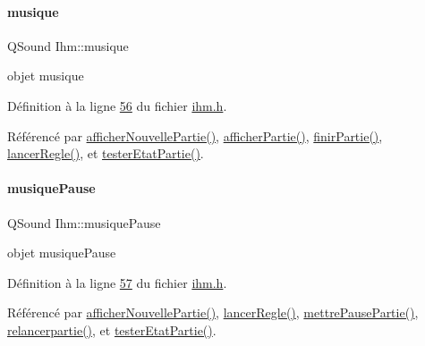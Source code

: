 \mbox{\label{class_ihm_a6e2a173ec36ee846d6210117b4b85fa8}} 
\paragraph{\texorpdfstring{musique}{musique}}
{\footnotesize\ttfamily Q\+Sound Ihm\+::musique\hspace{0.3cm}{\ttfamily [private]}}



objet musique 



Définition à la ligne \hyperlink{ihm_8h_source_l00056}{56} du fichier \hyperlink{ihm_8h_source}{ihm.\+h}.



Référencé par \hyperlink{ihm_8cpp_source_l00383}{afficher\+Nouvelle\+Partie()}, \hyperlink{ihm_8cpp_source_l00333}{afficher\+Partie()}, \hyperlink{ihm_8cpp_source_l00365}{finir\+Partie()}, \hyperlink{ihm_8cpp_source_l00623}{lancer\+Regle()}, et \hyperlink{ihm_8cpp_source_l00641}{tester\+Etat\+Partie()}.

\mbox{\label{class_ihm_a11e7ae529b6adb7ac98f1aa512172ff2}} 
\paragraph{\texorpdfstring{musique\+Pause}{musiquePause}}
{\footnotesize\ttfamily Q\+Sound Ihm\+::musique\+Pause\hspace{0.3cm}{\ttfamily [private]}}



objet musique\+Pause 



Définition à la ligne \hyperlink{ihm_8h_source_l00057}{57} du fichier \hyperlink{ihm_8h_source}{ihm.\+h}.



Référencé par \hyperlink{ihm_8cpp_source_l00383}{afficher\+Nouvelle\+Partie()}, \hyperlink{ihm_8cpp_source_l00623}{lancer\+Regle()}, \hyperlink{ihm_8cpp_source_l00519}{mettre\+Pause\+Partie()}, \hyperlink{ihm_8cpp_source_l00539}{relancerpartie()}, et \hyperlink{ihm_8cpp_source_l00641}{tester\+Etat\+Partie()}.

\mbox{\label{class_ihm_a633230fb15d587e647ad9d2d6142ebc3}} 
